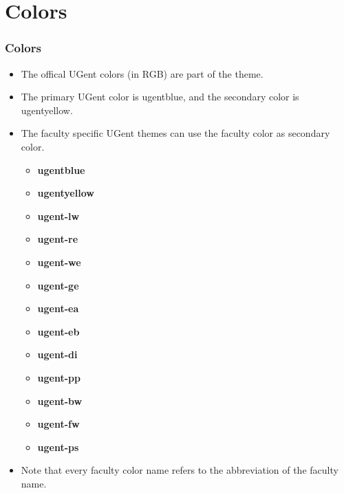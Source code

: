 \documentclass[aspectratio=169]{beamer}
\begin{document}
\section{Colors}

\begin{frame}
    \frametitle{Colors}
    \begin{itemize}
        \item The offical UGent colors (in RGB)  are part of the theme.
        \item The primary UGent color is {\color{ugentblue} ugentblue}, and the secondary color is {\color{ugentyellow} ugentyellow}.
        \item The faculty specific UGent themes can use the faculty color as secondary color.
            \begin{center}
                \begin{minipage}[t]{.35\textwidth}
                    \begin{itemize}
                        \item {\color{ugentblue}  \textbf{ugentblue}}
                        \item {\color{ugentyellow}\textbf{ugentyellow}}
                        \item {\color{ugent-lw}   \textbf{ugent-lw}}
                        \item {\color{ugent-re}   \textbf{ugent-re}}
                        \item {\color{ugent-we}   \textbf{ugent-we}}
                        \item {\color{ugent-ge}   \textbf{ugent-ge}}
                        \item {\color{ugent-ea}   \textbf{ugent-ea}}
                    \end{itemize}
                \end{minipage}%
                \begin{minipage}[t]{.35\textwidth}
                    \begin{itemize}
                        \item {\color{ugent-eb} \textbf{ugent-eb}}
                        \item {\color{ugent-di} \textbf{ugent-di}}
                        \item {\color{ugent-pp} \textbf{ugent-pp}}
                        \item {\color{ugent-bw} \textbf{ugent-bw}}
                        \item {\color{ugent-fw} \textbf{ugent-fw}}
                        \item {\color{ugent-ps} \textbf{ugent-ps}}
                    \end{itemize}
                \end{minipage}
                \vspace{.5cm}
            \end{center}
        \item Note that every faculty color name refers to the abbreviation of the faculty name.
    \end{itemize}
\end{frame}
\end{document}
